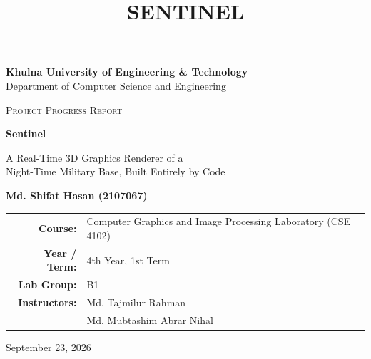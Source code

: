 \documentclass[11pt,a4paper]{article}
\title{\textbf{SENTINEL}}
\begin{document}
\begin{titlepage}
\thispagestyle{empty}
\centering
\vspace*{1.5cm}

{\LARGE \textbf{Khulna University of Engineering \& Technology}}\\[0.3em]
{\large Department of Computer Science and Engineering}

\vspace{1.5cm}

{\large \textsc{Project Progress Report}}

\vspace{2cm}

{\Huge \textbf{Sentinel}}

\vspace{0.8cm}

{\large A Real-Time 3D Graphics Renderer of a\\Night-Time Military Base, Built Entirely by Code}

\vspace{3cm}

{\large \textbf{Md. Shifat Hasan (2107067)}}

\vfill

\begin{tabular}{rl}
\textbf{Course:} & Computer Graphics and Image Processing Laboratory (CSE 4102) \\[0.3em]
\textbf{Year / Term:} & 4th Year, 1st Term \\[0.3em]
\textbf{Lab Group:} & B1 \\[0.3em]
\textbf{Instructors:} & Md. Tajmilur Rahman \\
& Md. Mubtashim Abrar Nihal \\
\end{tabular}

\vspace{2cm}

{\large September 23, 2026}

\end{titlepage}

\tableofcontents
\newpage
\end{document}
